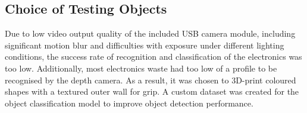 \subsection{Choice of Testing Objects}

Due to low video output quality of the included USB camera module, including significant motion blur and difficulties with exposure under different lighting conditions, the success rate of recognition and classification of the electronics was too low. Additionally, most electronics waste had too low of a profile to be recognised by the depth camera. As a result, it was chosen to 3D-print coloured shapes with a textured outer wall for grip. A custom dataset was created for the object classification model to improve object detection performance.

% 
% 
%   
% 
% 
